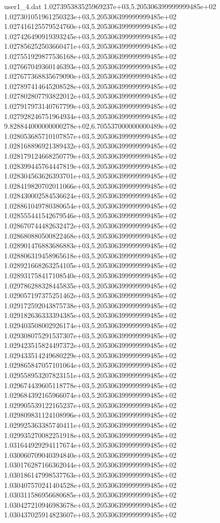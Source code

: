 \begin{filecontents}{user1_4.dat}
1.027395383525969237e+03,5.205306399999999485e+02
1.027301051961250323e+03,5.205306399999999485e+02
1.027416125579524760e+03,5.205306399999999485e+02
1.027426490919393245e+03,5.205306399999999485e+02
1.027856252503660471e+03,5.205306399999999485e+02
1.027551929877536168e+03,5.205306399999999485e+02
1.027667049360146393e+03,5.205306399999999485e+02
1.027677368835679090e+03,5.205306399999999485e+02
1.027897414645208528e+03,5.205306399999999485e+02
1.027802807793822012e+03,5.205306399999999485e+02
1.027917973140767799e+03,5.205306399999999485e+02
1.027928246751964934e+03,5.205306399999999485e+02
9.828844000000000278e+02,6.705537000000000489e+02
1.028053685710107857e+03,5.205306399999999485e+02
1.028168896921389432e+03,5.205306399999999485e+02
1.028179124668250779e+03,5.205306399999999485e+02
1.028399445764447819e+03,5.205306399999999485e+02
1.028304563626393701e+03,5.205306399999999485e+02
1.028419820702011066e+03,5.205306399999999485e+02
1.028430002584536624e+03,5.205306399999999485e+02
1.028861049780380654e+03,5.205306399999999485e+02
1.028555441542679546e+03,5.205306399999999485e+02
1.028670744482632472e+03,5.205306399999999485e+02
1.028680880500822468e+03,5.205306399999999485e+02
1.028901476883686883e+03,5.205306399999999485e+02
1.028806319458965618e+03,5.205306399999999485e+02
1.028921668263254105e+03,5.205306399999999485e+02
1.028931758417108540e+03,5.205306399999999485e+02
1.029786288328445835e+03,5.205306399999999485e+02
1.029057197375251462e+03,5.205306399999999485e+02
1.029172592043875738e+03,5.205306399999999485e+02
1.029182636333394385e+03,5.205306399999999485e+02
1.029403508002926174e+03,5.205306399999999485e+02
1.029308075291537307e+03,5.205306399999999485e+02
1.029423515824497372e+03,5.205306399999999485e+02
1.029433514249680229e+03,5.205306399999999485e+02
1.029865847057101064e+03,5.205306399999999485e+02
1.029558953207823151e+03,5.205306399999999485e+02
1.029674439605118778e+03,5.205306399999999485e+02
1.029684392165966074e+03,5.205306399999999485e+02
1.029905539122165237e+03,5.205306399999999485e+02
1.029809831124108996e+03,5.205306399999999485e+02
1.029925363385740411e+03,5.205306399999999485e+02
1.029935270082251918e+03,5.205306399999999485e+02
1.031644929294117674e+03,5.205306399999999485e+02
1.030060709040394840e+03,5.205306399999999485e+02
1.030176287166362044e+03,5.205306399999999485e+02
1.030186147998537763e+03,5.205306399999999485e+02
1.030407570241404528e+03,5.205306399999999485e+02
1.030311586956680685e+03,5.205306399999999485e+02
1.030427210946983678e+03,5.205306399999999485e+02
1.030437025914823607e+03,5.205306399999999485e+02

\end{filecontents}
